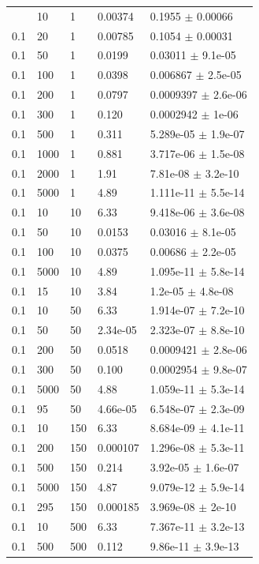 \begin{longtable}{lllll}
	\bottomrule
	\endlastfoot
	0.1 & 10 & 1 & 0.00374 & 0.1955 $\pm$ 0.00066 \\
	0.1 & 20 & 1 & 0.00785 & 0.1054 $\pm$ 0.00031 \\
	0.1 & 50 & 1 & 0.0199 & 0.03011 $\pm$ 9.1e-05 \\
	0.1 & 100 & 1 & 0.0398 & 0.006867 $\pm$ 2.5e-05 \\
	0.1 & 200 & 1 & 0.0797 & 0.0009397 $\pm$ 2.6e-06 \\
	0.1 & 300 & 1 & 0.120 & 0.0002942 $\pm$ 1e-06 \\
	0.1 & 500 & 1 & 0.311 & 5.289e-05 $\pm$ 1.9e-07 \\
	0.1 & 1000 & 1 & 0.881 & 3.717e-06 $\pm$ 1.5e-08 \\
	0.1 & 2000 & 1 & 1.91 & 7.81e-08 $\pm$ 3.2e-10 \\
	0.1 & 5000 & 1 & 4.89 & 1.111e-11 $\pm$ 5.5e-14 \\
	0.1 & 10 & 10 & 6.33 & 9.418e-06 $\pm$ 3.6e-08 \\
	0.1 & 50 & 10 & 0.0153 & 0.03016 $\pm$ 8.1e-05 \\
	0.1 & 100 & 10 & 0.0375 & 0.00686 $\pm$ 2.2e-05 \\
	0.1 & 5000 & 10 & 4.89 & 1.095e-11 $\pm$ 5.8e-14 \\
	0.1 & 15 & 10 & 3.84 & 1.2e-05 $\pm$ 4.8e-08 \\
	0.1 & 10 & 50 & 6.33 & 1.914e-07 $\pm$ 7.2e-10 \\
	0.1 & 50 & 50 & 2.34e-05 & 2.323e-07 $\pm$ 8.8e-10 \\
	0.1 & 200 & 50 & 0.0518 & 0.0009421 $\pm$ 2.8e-06 \\
	0.1 & 300 & 50 & 0.100 & 0.0002954 $\pm$ 9.8e-07 \\
	0.1 & 5000 & 50 & 4.88 & 1.059e-11 $\pm$ 5.3e-14 \\
	0.1 & 95 & 50 & 4.66e-05 & 6.548e-07 $\pm$ 2.3e-09 \\
	0.1 & 10 & 150 & 6.33 & 8.684e-09 $\pm$ 4.1e-11 \\
	0.1 & 200 & 150 & 0.000107 & 1.296e-08 $\pm$ 5.3e-11 \\
	0.1 & 500 & 150 & 0.214 & 3.92e-05 $\pm$ 1.6e-07 \\
	0.1 & 5000 & 150 & 4.87 & 9.079e-12 $\pm$ 5.9e-14 \\
	0.1 & 295 & 150 & 0.000185 & 3.969e-08 $\pm$ 2e-10 \\
	0.1 & 10 & 500 & 6.33 & 7.367e-11 $\pm$ 3.2e-13 \\
	0.1 & 500 & 500 & 0.112 & 9.86e-11 $\pm$ 3.9e-13 \\

\end{longtable}
